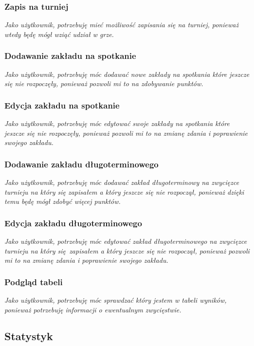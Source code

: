 \documentclass{mwrep}[15pt]
\begin{document}
\subsubsection{Zapis na turniej}
\emph{Jako użytkownik, potrzebuję mieć możliwość zapisania się na turniej, ponieważ wtedy będę mógł wziąć udział w grze.}

\subsubsection{Dodawanie zakładu na spotkanie}
\emph{Jako użytkownik, potrzebuję móc dodawać nowe zakłady na spotkania które jeszcze się nie rozpoczęły, ponieważ pozwoli mi to na zdobywanie punktów.}

\subsubsection{Edycja zakładu na spotkanie}
\emph{Jako użytkownik, potrzebuję móc edytować swoje zakłady na spotkania które jeszcze się nie rozpoczęły, ponieważ pozwoli mi to na zmianę zdania i poprawienie swojego zakładu.}

\subsubsection{Dodawanie zakładu długoterminowego}
\emph{Jako użytkownik, potrzebuję móc dodawać zakład długoterminowy na zwycięzce turnieju na który się zapisałem a który jeszcze się nie rozpoczął, ponieważ dzięki temu będę mógł zdobyć więcej punktów.}

\subsubsection{Edycja zakładu długoterminowego}
\emph{Jako użytkownik, potrzebuję móc edytować zakład długoterminowego na zwycięzce turnieju na który się zapisałem a który jeszcze się nie rozpoczął, ponieważ pozwoli mi to na zmianę zdania i poprawienie swojego zakładu.}

\subsubsection{Podgląd tabeli}
\emph{Jako użytkownik, potrzebuję móc sprawdzać który jestem w tabeli wyników, ponieważ potrzebuję informacji o ewentualnym zwycięstwie.}

\subsection{Statystyk}
\end{document}
